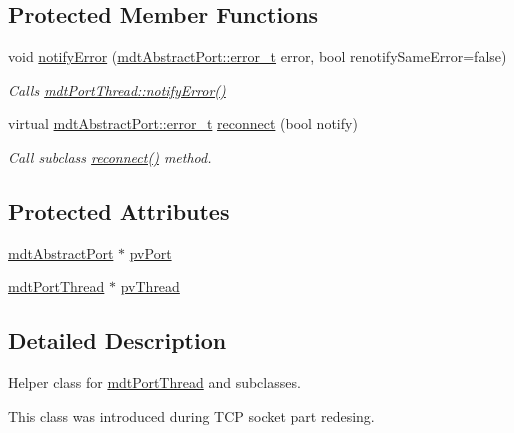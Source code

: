 \subsection*{Protected Member Functions}
\begin{DoxyCompactItemize}
\item 
void \hyperlink{classmdt_port_thread_helper_aaa98db16bfcc30d82e9d542fc2a52d6b}{notify\-Error} (\hyperlink{classmdt_abstract_port_ad4121bb930c95887e77f8bafa065a85e}{mdt\-Abstract\-Port\-::error\-\_\-t} error, bool renotify\-Same\-Error=false)
\begin{DoxyCompactList}\small\item\em Calls \hyperlink{classmdt_port_thread_a30bdd11ef16d4f3321921c9d9b26399d}{mdt\-Port\-Thread\-::notify\-Error()} \end{DoxyCompactList}\item 
virtual \hyperlink{classmdt_abstract_port_ad4121bb930c95887e77f8bafa065a85e}{mdt\-Abstract\-Port\-::error\-\_\-t} \hyperlink{classmdt_port_thread_helper_a1d0874434ae6442610e2bc685be6458f}{reconnect} (bool notify)
\begin{DoxyCompactList}\small\item\em Call subclass \hyperlink{classmdt_port_thread_helper_a1d0874434ae6442610e2bc685be6458f}{reconnect()} method. \end{DoxyCompactList}\end{DoxyCompactItemize}
\subsection*{Protected Attributes}
\begin{DoxyCompactItemize}
\item 
\hyperlink{classmdt_abstract_port}{mdt\-Abstract\-Port} $\ast$ \hyperlink{classmdt_port_thread_helper_ada4497db38cb418c2021aecaf4caa36c}{pv\-Port}
\item 
\hyperlink{classmdt_port_thread}{mdt\-Port\-Thread} $\ast$ \hyperlink{classmdt_port_thread_helper_a44780de0f664de18ca999ef43321c525}{pv\-Thread}
\end{DoxyCompactItemize}


\subsection{Detailed Description}
Helper class for \hyperlink{classmdt_port_thread}{mdt\-Port\-Thread} and subclasses. 

This class was introduced during T\-C\-P socket part redesing.

